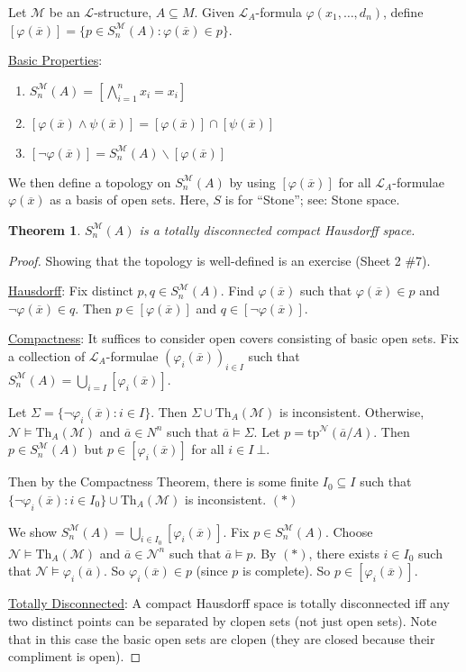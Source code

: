 \documentclass[]{article}
\theoremstyle{custhm}
\newtheorem{theorem}{Theorem}[section]
\theoremstyle{cusdef}
\theoremstyle{custhm}
\theoremstyle{custhm}
\theoremstyle{custhm}
\theoremstyle{ex}
\theoremstyle{custhm}
\theoremstyle{cusdef}
\theoremstyle{remark}
\theoremstyle{remark}
\renewcommand{\L}{\mathcal{L}}
\newcommand{\M}{\mathcal{M}}
\renewcommand{\phi}{\varphi}
\renewcommand{\bar}{\overline}
\newcommand{\Th}{\textrm{Th}}
\newcommand{\tp}{\textrm{tp}}
\newcommand{\false}{\bot}
\newcommand{\N}{\mathcal{N}}
\newcommand{\sman}{S_n^\M(A)}
\renewcommand{\subset}{\subseteq}
\begin{document}
Let $\M$ be an $\L$-structure, $A\subset M$. Given $\L_A$-formula $\phi(x_1,\dots,d_n)$, define $[\phi(\bar{x})] = \{p \in S_n^\M(A):\phi(\bar{x}) \in p\}$.

\underline{Basic Properties}:
\begin{enumerate}[label = \arabic*.]
	\item $\sman = \left[\bigwedge_{i=1}^{n}x_i = x_i\right]$
	\item $\left[\phi(\bar{x})\land\psi(\bar{x})\right] = [\phi(\bar{x})]\cap [\psi(\bar{x})]$
	\item $\left[\neg \phi(\bar{x})\right] = \sman\backslash \left[\phi(\bar{x})\right]$
\end{enumerate}
We then define a topology on $\sman$ by using $[\phi(\bar{x})]$ for all $\L_A$-formulae $\phi(\bar{x})$ as a basis of open sets. Here, $S$ is for ``Stone''; see: Stone space.

\begin{theorem}
$\sman$ is a totally disconnected compact Hausdorff space.
\end{theorem}
\begin{proof}
Showing that the topology is well-defined is an exercise (Sheet 2 \#7).

\underline{Hausdorff}: Fix distinct $p,q \in \sman$. Find $\phi(\bar{x})$ such that $\phi(\bar{x}) \in p$ and $\neg\phi(\bar{x}) \in q$. Then $p \in [\phi(\bar{x})]$ and $q \in [\neg \phi(\bar{x})]$.

\underline{Compactness}: It suffices to consider open covers consisting of basic open sets. Fix a collection of $\L_A$-formulae $(\phi_i(\bar{x}))_{i\in I}$ such that $\sman = \bigcup_{i=I}\left[\phi_i(\bar{x})\right]$.

Let $\Sigma = \{\neg \phi_i(\bar{x}):i\in I\}$. Then $\Sigma \cup \Th_A(\M)$ is inconsistent. Otherwise, $\N\models \Th_A(\M)$ and $\bar{a}\in N^n$ such that $\bar{a} \models \Sigma$. Let $p = \tp^\N(\bar{a}/A)$. Then $p \in \sman$ but $p \in [\phi_i(\bar{x})]$ for all $i \in I\ \false$.

Then by the Compactness Theorem, there is some finite $I_0 \subset I$ such that $\{\neg \phi_i(\bar{x}):i\in I_0\}\cup\Th_A(\M)$ is inconsistent. $(\ast)$

We show $\sman = \bigcup_{i\in I_0}[\phi_i(\bar{x})]$. Fix $p \in \sman$. Choose $\N\models \Th_A(\M)$ and $\bar{a} \in \N^n$ such that $\bar{a}\models p$. By $(\ast)$, there exists $i \in I_0$ such that $\N\models \phi_i(\bar{a})$. So $\phi_i(\bar{x})\in p$ (since $p$ is complete). So $p \in [\phi_i(\bar{x})]$.

\underline{Totally Disconnected}: A compact Hausdorff space is totally disconnected iff any two distinct  points can be separated by clopen sets (not just open sets). Note that in this case the basic open sets are clopen (they are closed because their compliment is open).
\end{proof}
\end{document}
